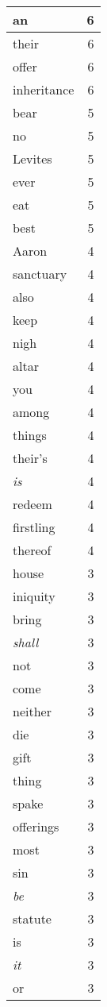 \begin{center}
\begin{longtable}{l|r}
an & 6 \\ \hline
their & 6 \\ \hline
offer & 6 \\ \hline
inheritance & 6 \\ \hline
bear & 5 \\ \hline
no & 5 \\ \hline
Levites & 5 \\ \hline
ever & 5 \\ \hline
eat & 5 \\ \hline
best & 5 \\ \hline
Aaron & 4 \\ \hline
sanctuary & 4 \\ \hline
also & 4 \\ \hline
keep & 4 \\ \hline
nigh & 4 \\ \hline
altar & 4 \\ \hline
you & 4 \\ \hline
among & 4 \\ \hline
things & 4 \\ \hline
their's & 4 \\ \hline
\emph{is} & 4 \\ \hline
redeem & 4 \\ \hline
firstling & 4 \\ \hline
thereof & 4 \\ \hline
house & 3 \\ \hline
iniquity & 3 \\ \hline
bring & 3 \\ \hline
\emph{shall} & 3 \\ \hline
not & 3 \\ \hline
come & 3 \\ \hline
neither & 3 \\ \hline
die & 3 \\ \hline
gift & 3 \\ \hline
thing & 3 \\ \hline
spake & 3 \\ \hline
offerings & 3 \\ \hline
most & 3 \\ \hline
sin & 3 \\ \hline
\emph{be} & 3 \\ \hline
statute & 3 \\ \hline
is & 3 \\ \hline
\emph{it} & 3 \\ \hline
or & 3 \\ \hline

\end{longtable}
\end{center}
